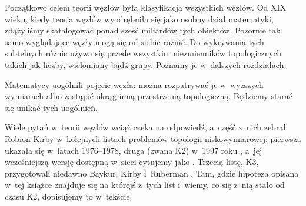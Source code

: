 Początkowo celem teorii węzłów była klasyfikacja wszystkich węzłów.
Od XIX wieku, kiedy teoria węzłów wyodrębniła się jako osobny dział matematyki, zdążyliśmy skatalogować ponad sześć miliardów tych obiektów.
Pozornie tak samo wyglądające węzły mogą się od siebie różnić.
Do wykrywania tych subtelnych różnic używa się przede wszystkim niezmienników topologicznych takich jak liczby, wielomiany bądź grupy.
Poznamy je w~dalszych rozdziałach.

Matematycy uogólnili pojęcie węzła: można rozpatrywać je w~wyższych wymiarach albo zastąpić okrąg inną przestrzenią topologiczną.
Będziemy starać się unikać tych uogólnień.

Wiele pytań w~teorii węzłów wciąż czeka na odpowiedź, a~część z~nich zebrał Robion Kirby w~kolejnych listach problemów topologii niskowymiarowej: pierwsza ukazała się w~latach 1976--1978, druga (zwana K2) w~1997 roku \cite{kirby1997}, a~jej wcześniejszą wersję dostępną w~sieci cytujemy jako \cite{kirby1978}.
Trzecią listę, K3, przygotowali niedawno Baykur, Kirby i~Ruberman \cite{baykur2026}.
%
%
%
Tam, gdzie hipoteza opisana w~tej książce znajduje się na którejś z~tych list i~wiemy, co się z~nią stało od czasu K2, dopisujemy to w~tekście.

